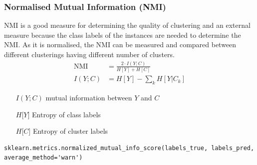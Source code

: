 \documentclass[11pt]{article}
\theoremstyle{definition}
\begin{document}
\subsubsection{Normalised Mutual Information (NMI)}
NMI is a good measure for determining the quality of clustering and an external measure because the class labels of the instances are needed to determine the NMI. As it is normalised, the NMI can be measured and compared between different clusterings having different number of clusters.
\begin{align*}
	\text{NMI} &= \frac{2\cdot I(Y;C)}{H[Y] + H[C]}\\
	I(Y;C) &= H[Y] - \sum_k H[Y|C_k]
\end{align*}
\begin{itemize}[nosep, leftmargin=*, labelindent=5cm, labelsep=0.5cm]
	\item[$I(Y;C)$] mutual information between $Y$ and $C$
	\item[$H\lbrack Y \rbrack$] Entropy of class labels
	\item[$H\lbrack C \rbrack$] Entropy of cluster labels
\end{itemize}
\begin{verbatim}
sklearn.metrics.normalized_mutual_info_score(labels_true, labels_pred, average_method='warn')
\end{verbatim}
\end{document}
